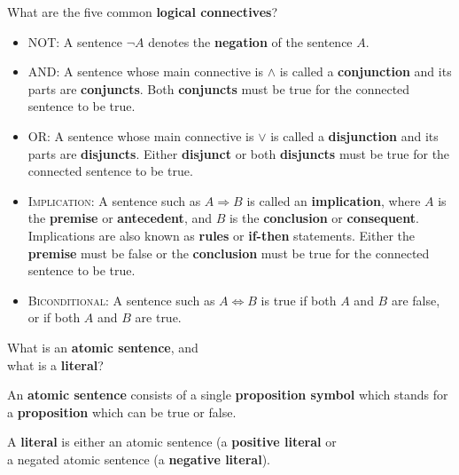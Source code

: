 \begin{flashcard}[Question]{What are the five common \textbf{logical connectives}?}
\footnotesize
\begin{itemize}
\item \textsc{NOT}: A sentence $\neg A$ denotes the \textbf{negation} of the sentence $A$.
\item \textsc{AND}: A sentence whose main connective is $\land$ is called a \textbf{conjunction} and its parts are \textbf{conjuncts}. Both \textbf{conjuncts} must be true for the connected sentence to be true.
\item \textsc{OR}: A sentence whose main connective is $\lor$ is called a \textbf{disjunction} and its parts are \textbf{disjuncts}. Either \textbf{disjunct} or both \textbf{disjuncts} must be true for the connected sentence to be true.
\item \textsc{Implication}: A sentence such as $A \Rightarrow B$ is called an \textbf{implication}, where $A$ is the \textbf{premise} or \textbf{antecedent}, and $B$ is the \textbf{conclusion} or \textbf{consequent}. Implications are also known as \textbf{rules} or \textbf{if-then} statements. Either the \textbf{premise} must be false or the \textbf{conclusion} must be true for the connected sentence to be true.
\item \textsc{Biconditional}: A sentence such as $A \Leftrightarrow B$ is true if both $A$ and $B$ are false, or if both $A$ and $B$ are true.
\end{itemize}
\end{flashcard}

\begin{flashcard}[Question]{What is an \textbf{atomic sentence}, and\\what is a \textbf{literal}?}
\begin{center}
An \textbf{atomic sentence} consists of a single \textbf{proposition symbol} which stands for a \textbf{proposition} which can be true or false.

\medskip

A \textbf{literal} is either an atomic sentence (a \textbf{positive literal} or\\a negated atomic sentence (a \textbf{negative literal}).
\end{center}
\end{flashcard}

